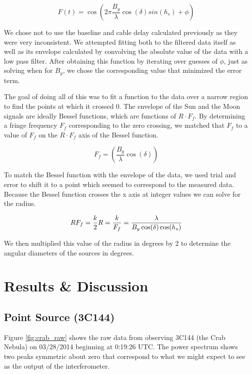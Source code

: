\documentclass{article}
\begin{document}
  \[F(t) = \cos \left (2\pi \frac{B_{y}}{\lambda} \cos(\delta)
      sin(h_{s}) + \phi \right)\]

  We chose not to use the baseline and cable delay calculated previously as they
  were very inconsistent. We attempted fitting both to the filtered data itself as well as its envelope
  calculated by convolving the absolute value of the data with a low pass filter.
  After obtaining this function by iterating over guesses of $\phi$, just as
  solving when for $B_{y}$, we chose the corresponding value that minimized the
  error term.

  The goal of doing all of this was to fit a function to the data over a narrow
  region to find the points at which it crossed 0. The envelope of the Sun and
  the Moon signals are ideally Bessel functions, which are functions of  $R \cdot
  F_{f}$. By determining a fringe frequency $F_{f}$ corresponding to the zero
  crossing, we matched that $F_{f}$ to a value of $F_{f}$ on the $R \cdot
  F_{f}$ axis of the Bessel function.

  \[F_{f} = \left (\frac{B_{y}}{\lambda}\cos(\delta)\right ) \]

  To match the Bessel function with the envelope of the data, we used trial and
  error to shift it to a point which seemed to correspond to the measured data.
  Because the Bessel function crosses the x axis at integer values we can solve
  for the radius.

  \[RF_{f}=\frac{k}{2} \\
      R = \frac{k}{F_{f}} = \frac{\lambda}{B_{y}\cos(\delta)\cos(h_{s})}
  \]

  We then multiplied this value of the radius in degrees by 2 to determine the
  angular diameters of the sources in degrees.


\section{Results \& Discussion}

\subsection{Point Source (3C144)}
  Figure \ref{fig:crab_raw} shows the raw data from observing 3C144 (the Crab
  Nebula) on 03/28/2014 beginning at 0:19:26 UTC. The power spectrum shows two
  peaks symmetric about zero that correspond to what we might expect to see as
  the output of the interferometer.
\end{document}
